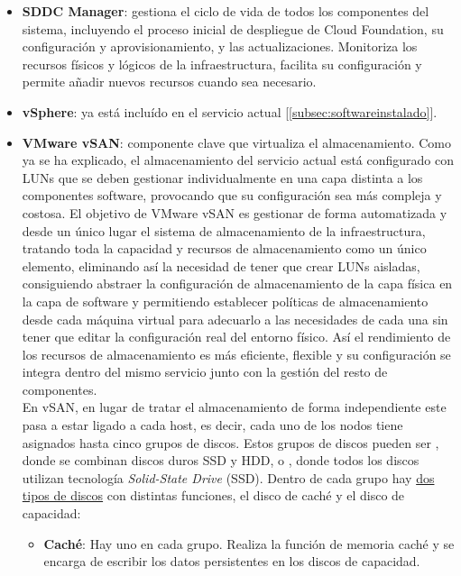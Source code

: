 \begin{itemize}
    \item \textbf{SDDC Manager}: gestiona el ciclo de vida de todos los componentes del sistema, incluyendo el proceso inicial de despliegue de Cloud Foundation, su configuración y aprovisionamiento, y las actualizaciones. Monitoriza los recursos físicos y lógicos de la infraestructura, facilita su configuración y permite añadir nuevos recursos cuando sea necesario. 
    \item \textbf{vSphere}: ya está incluído en el servicio actual [\ref{subsec:softwareinstalado}].
    \item \textbf{VMware vSAN}: componente clave que virtualiza el almacenamiento. Como ya se ha explicado, el almacenamiento del servicio actual está configurado con LUNs que se deben gestionar individualmente en una capa distinta a los componentes software, provocando que su configuración sea más compleja y costosa. El objetivo de VMware vSAN es gestionar de forma automatizada y desde un único lugar el sistema de almacenamiento de la infraestructura, tratando toda la capacidad y recursos de almacenamiento como un único elemento, eliminando así la necesidad de tener que crear LUNs aisladas, consiguiendo abstraer la configuración de almacenamiento de la capa física en la capa de software y permitiendo establecer políticas de almacenamiento desde cada máquina virtual para adecuarlo a las necesidades de cada una sin tener que editar la configuración real del entorno físico. Así el rendimiento de los recursos de almacenamiento es más eficiente, flexible y su configuración se integra dentro del mismo servicio junto con la gestión del resto de componentes. \\
    En vSAN, en lugar de tratar el almacenamiento de forma independiente este pasa a estar ligado a cada host, es decir, cada uno de los nodos tiene asignados hasta cinco grupos de discos. Estos grupos de discos pueden ser , donde se combinan discos duros SSD y HDD, o , donde todos los discos utilizan tecnología \textit{Solid-State Drive} (SSD). Dentro de cada grupo hay \underline{dos tipos de discos} con distintas funciones, el disco de caché y el disco de capacidad\cite{operacionesVSAN}:
        \begin{itemize}
            \item \textbf{Caché}: Hay uno en cada grupo. Realiza la función de memoria caché y se encarga de escribir los datos persistentes en los discos de capacidad.

\end{itemize}
\end{itemize}

